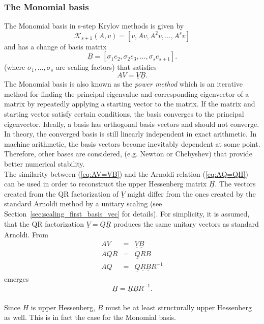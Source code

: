 \documentclass{scrartcl}
\numberwithin{equation}{section}
\begin{document}
\subsubsection{The Monomial basis}
The Monomial basis in s-step Krylov methods is given by 
\begin{equation*}
\mathcal{K}_{s + 1}(A, v) = [v, Av, A^2v, \ldots, A^sv]
\end{equation*}
and has a change of basis matrix
\begin{equation*}
\underline{B} = [\sigma_1 e_2, \sigma_2 e_3, \ldots, \sigma_s e_{s + 1}].
\end{equation*}
(where $\sigma_1, \ldots, \sigma_s$ are scaling factors) that satisfies
\begin{equation} \label{eq:AV=VB}
AV = \underline{V} \underline{B}.
\end{equation}
The Monomial basis is also known as the \textit{power method} which is an iterative method for finding the principal eigenvalue and corresponding eigenvector of a matrix by repeatedly applying a starting vector to the matrix. If the matrix and starting vector satisfy certain conditions, the basis converges to the principal eigenvector. Ideally, a basis has orthogonal basis vectors and should not converge. In theory, the converged basis is still linearly independent in exact arithmetic. In machine arithmetic, the basis vectors become inevitably dependent at some point. Therefore, other bases are considered, (e.g. Newton or Chebyshev) that provide better numerical stability.\\

The similarity between (\ref{eq:AV=VB}) and the Arnoldi relation (\ref{eq:AQ=QH}) can be used in order to reconstruct the upper Hessenberg matrix $\underline{H}$. The vectors created from the QR factorization of $\underline{V}$ might differ from the ones created by the standard Arnoldi method by a unitary scaling (see Section~\ref{sec:scaling_first_basis_vec} for details). For simplicity, it is assumed, that the QR factorization $\underline{V} = \underline{Q} \underline{R}$ produces the same unitary vectors as standard Arnoldi. From
\begin{eqnarray} \label{eq:unitary_scaling}
	AV &=& \underline{V} \underline{B} \nonumber\\
	AQR &=& \underline{Q} \underline{R} \underline{B} \nonumber\\
	AQ &=& \underline{Q} \underline{R} \underline{B} R^{-1}
\end{eqnarray}
emerges
\begin{equation} \label{eq:H=RBR}
	\underline{H} = \underline{R} \underline{B} R^{-1}.
\end{equation}
\\
Since $\underline{H}$ is upper Hessenberg, $\underline{B}$ must be at least structurally upper Hessenberg as well. This is in fact the case for the Monomial basis.
\end{document}
